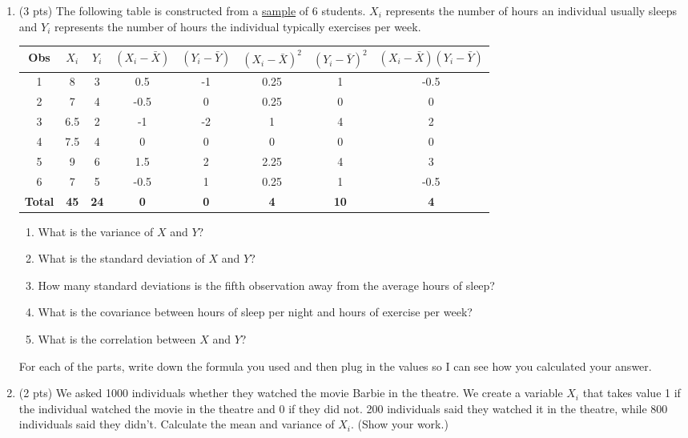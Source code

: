 \documentclass{./../../Latex/handout}
\begin{document}
\begin{enumerate}
\item (3 pts) The following table is constructed from a \underline{sample} of 6 students. $X_i$ represents the number of hours an individual usually sleeps and $Y_i$ represents the number of hours the individual typically exercises per week.  
\begin{center}
\footnotesize
\def\arraystretch{1.5}%
\begin{tabular}{|c|c|c|c|c|c|c|c|}
\hline
Obs & $X_i$ & $Y_i$ & $(X_i-\bar{X})$ & $(Y_i-\bar{Y})$ & $(X_i-\bar{X})^2$ & $(Y_i-\bar{Y})^2$ & $(X_i-\bar{X})(Y_i-\bar{Y})$  \\ \hline
1 & 8 & 3 & 0.5 & -1 & 0.25 & 1 & -0.5 \\ \hline
2 & 7 & 4 & -0.5 & 0 & 0.25 & 0 & 0 \\ \hline
3 & 6.5 & 2 & -1 & -2 & 1 & 4 & 2 \\ \hline
4 & 7.5 & 4 & 0 & 0 & 0 & 0 & 0 \\ \hline
5 & 9 & 6 & 1.5 & 2 & 2.25 & 4 & 3 \\ \hline
6 & 7 & 5 & -0.5 & 1 & 0.25 & 1 & -0.5 \\ \hline
\textbf{Total} & \textbf{45} & \textbf{24} & \textbf{0} & \textbf{0} & \textbf{4} & \textbf{10} & \textbf{4} \\ \hline
\end{tabular}
\end{center}
\begin{enumerate}
\item What is the variance of $X$ and $Y$? 
\item What is the standard deviation of $X$ and $Y$? 
\item How many standard deviations is the fifth observation away from the average hours of sleep? 
\item What is the covariance between hours of sleep per night and hours of exercise per week? 
\item What is the correlation between $X$ and $Y$? 
\end{enumerate}
For each of the parts, write down the formula you used and then plug in the values so I can see how you calculated your answer.

\item (2 pts) We asked 1000 individuals whether they watched the movie Barbie in the theatre. We create a variable $X_i$ that takes value 1 if the individual watched the movie in the theatre and 0 if they did not. 200 individuals said they watched it in the theatre, while 800 individuals said they didn’t. Calculate the mean and variance of $X_i$. (Show your work.) 
\end{enumerate}
\end{document}
